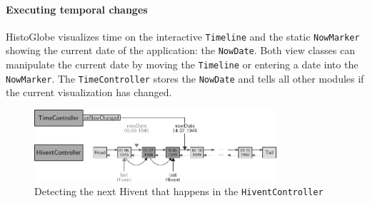 
\paragraph{Executing temporal changes} %
\label{par:executing_temporal_changes}

HistoGlobe visualizes time on the interactive \texttt{Timeline} and the static \texttt{NowMarker} showing the current date of the application: the \texttt{NowDate}. Both view classes can manipulate the current date by moving the \texttt{Timeline} or entering a date into the \texttt{NowMarker}. The \texttt{TimeController} stores the \texttt{NowDate} and tells all other modules if the current visualization has changed.

\begin{figure}[ht]
  \vspace{1em}
  \centering
  \includegraphics[width=0.8\textwidth]{graphics/development/application/hivent_controller}
  \caption{Detecting the next Hivent that happens in the \texttt{HiventController}}
  \label{fig:hivent_controller}
\end{figure}

